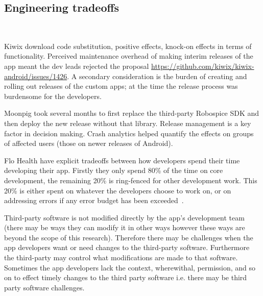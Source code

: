 \subsection{Engineering tradeoffs}~\label{aiu-engineering-tradeoffs-section}

Kiwix download code substitution, positive effects, knock-on effects in terms of functionality.
Perceived maintenance overhead of making interim releases of the app meant the dev leads rejected the proposal \url{https://github.com/kiwix/kiwix-android/issues/1426}. A secondary consideration is the burden of creating and rolling out releases of the custom apps; at the time the release process was burdensome for the developers. 

Moonpig took several months to first replace the third-party Robospice SDK and then deploy the new release without that library. 
Release management is a key factor in decision making. Crash analytics helped quantify the effects on groups of affected users (those on newer releases of Android).

Flo Health have explicit tradeoffs between how developers spend their time developing their app. Firstly they only spend 80\% of the time on core development, the remaining 20\% is ring-fenced for other development work. This 20\% is either spent on whatever the developers choose to work on, or on addressing errors if any error budget has been exceeded~\citep{koutun2021_how_to_deal_with_tech_debt_at_the_scale_of_super_app}.


Third-party software is not modified directly by the app's development team (there may be ways they can modify it in other ways however these ways are beyond the scope of this research). Therefore there may be challenges when the app developers want or need changes to the third-party software. Furthermore the third-party may control what modifications are made to that software. Sometimes the app developers lack the context, wherewithal, permission, and so on to effect timely changes to the third party software i.e. there may be third party software challenges.

